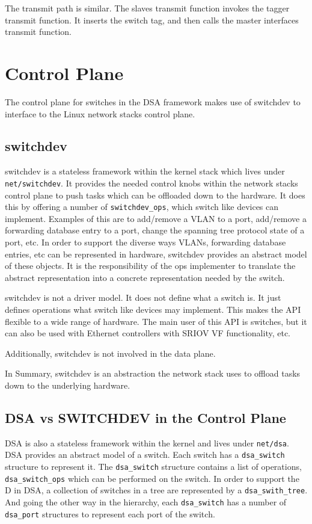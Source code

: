 \documentclass[letterpaper]{article}
\begin{document}
The transmit path is similar. The slaves transmit function invokes the
tagger transmit function. It inserts the switch tag, and then calls
the master interfaces transmit function.

\section{Control Plane}

The control plane for switches in the DSA framework makes use of
switchdev to interface to the Linux network stacks control plane.

\subsection{switchdev}

switchdev is a stateless framework within the kernel stack which lives
under \verb|net/switchdev|. It provides the needed control knobs
within the network stacks control plane to push tasks which can be
offloaded down to the hardware. It does this by offering a number of
\verb|switchdev_ops|, which switch like devices can
implement. Examples of this are to add/remove a VLAN to a port,
add/remove a forwarding database entry to a port, change the spanning
tree protocol state of a port, etc. In order to support the diverse
ways VLANs, forwarding database entries, etc can be represented in
hardware, switchdev provides an abstract model of these objects. It is
the responsibility of the ops implementer to translate the abstract
representation into a concrete representation needed by the switch.

switchdev is not a driver model. It does not define what a switch
is. It just defines operations what switch like devices may
implement. This makes the API flexible to a wide range of
hardware. The main user of this API is switches, but it can also be
used with Ethernet controllers with SRIOV VF functionality, etc.

Additionally, switchdev is not involved in the data plane.

In Summary, switchdev is an abstraction the network stack uses to
offload tasks down to the underlying hardware.

\subsection{DSA vs SWITCHDEV in the Control Plane}

DSA is also a stateless framework within the kernel and lives under
\verb|net/dsa|. DSA provides an abstract model of a switch. Each
switch has a \verb|dsa_switch| structure to represent it. The
\verb|dsa_switch| structure contains a list of operations,
\verb|dsa_switch_ops| which can be performed on the switch. In order
to support the D in DSA, a collection of switches in a tree are
represented by a \verb|dsa_swith_tree|. And going the other way in the
hierarchy, each \verb|dsa_switch| has a number of \verb|dsa_port|
structures to represent each port of the switch.
\end{document}
